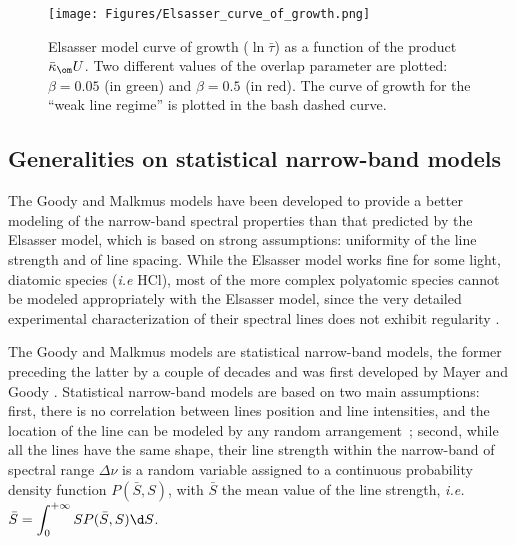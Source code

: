 \begin{figure}
\begin{center}
 \texttt{[image: Figures/Elsasser\_curve\_of\_growth.png]}
\end{center}
 \caption{Elsasser model curve of growth ($\ln \bar{\tau}$) as a function of the product $\bar{\kappa}_{\om} U$. Two different values of the overlap parameter are plotted: $\beta = 0.05$ (in green) and $\beta = 0.5$ (in red). The curve of growth for the ``weak line regime'' is plotted in the bash dashed curve.\label{fig::Elsasser_curve_growth}}
\end{figure}

\subsection{Generalities on statistical narrow-band models}
The Goody and Malkmus models have been developed to provide a better modeling of the narrow-band spectral properties than that predicted by the Elsasser model, which is based on strong assumptions: uniformity of the line strength and of line spacing. While the Elsasser model works fine for some light, diatomic  species (\textit{i.e} HCl), most of the more complex polyatomic species cannot be modeled appropriately with the Elsasser model, since the very detailed experimental characterization of their spectral lines does not exhibit regularity \cite{Modest2013}.

The Goody and Malkmus models are statistical narrow-band models, the former preceding the latter by a couple of decades and was first developed by Mayer and Goody \cite{Penner1959}. Statistical narrow-band models are based on two main assumptions: first, there is no correlation between lines position and line intensities, and the location of the line can be modeled by any random arrangement~\cite{Penner1959,Young1977d}; second, while all the lines have the same shape, their line strength within the narrow-band of spectral range $\Delta \nu$ is a random variable assigned to a continuous probability density function $P(\bar{S},S)$, with $\bar{S}$ the mean value of the line strength, \textit{i.e.} $\bar{S} = \displaystyle\int_{0}^{+\infty}{S P(\bar{S},S)\d S}$.

